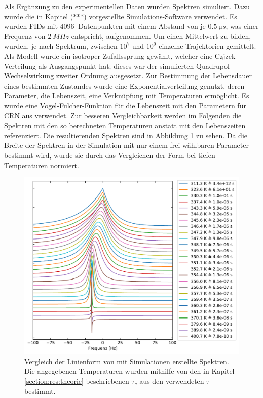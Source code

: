 Als Ergänzung zu den experimentellen Daten wurden Spektren simuliert. Dazu wurde die in Kapitel (***) vorgestellte Simulations-Software verwendet. Es wurden FIDs mit $\SI{4096}{}$ Datenpunkten mit einem Abstand von je $\SI{0.5}{\micro s}$, was einer Frequenz von $\SI{2}{MHz}$ entspricht, aufgenommen. Um einen Mittelwert zu bilden, wurden, je nach Spektrum, zwischen $10^{7}$ und $10^{9}$ einzelne Trajektorien gemittelt. Als Modell wurde ein isotroper Zufallssprung gewählt, welcher eine Czjzek-Verteilung als Ausgangspunkt hat; dieses war der simulierten Quadrupol-Wechselwirkung zweiter Ordnung ausgesetzt. Zur Bestimmung der Lebensdauer eines bestimmten Zustandes wurde eine Exponentialverteilung genutzt, deren Parameter, die Lebenszeit, eine Verknüpfung mit Temperaturen ermöglicht. Es wurde eine Vogel-Fulcher-Funktion für die Lebenszeit mit den Parametern für CRN aus \cite{PIMENOV199793} verwendet. Zur besseren Vergleichbarkeit werden im Folgenden die Spektren mit den so berechneten Temperaturen anstatt mit den Lebenszeiten referenziert. Die resultierenden Spektren sind in Abbildung \ref{fig:res:sim_linienform} zu sehen. Da die Breite der Spektren in der Simulation mit nur einem frei wählbaren Parameter bestimmt wird, wurde sie durch das Vergleichen der Form bei tiefen Temperaturen normiert.
\begin{figure}
	\begin{center}
		\includegraphics[width=\textwidth]{graphics/plot/sim_lineshape.pdf}
	\end{center}
	\caption{Vergleich der Linienform von mit Simulationen erstellte Spektren. Die angegebenen Temperaturen wurden mithilfe von den in Kapitel \ref{section:res:theorie} beschriebenen $\tau_c$ aus den verwendeten $\tau$ bestimmt.} \label{fig:res:sim_linienform}
\end{figure}

